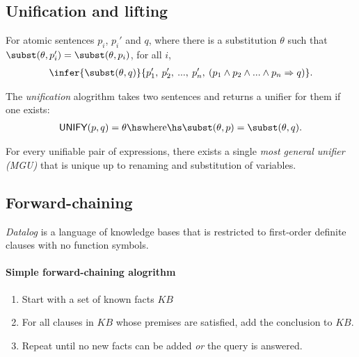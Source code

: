 \documentclass{article}
\begin{document}
\subsection{Unification and lifting}

\begin{theorem}
    For atomic sentences $p_i$, $p_i'$ and $q$, where there is a substitution
    $\theta$ such that $\subst(\theta,p_i')=\subst(\theta,p_i)$, for
    all $i$,
    \begin{align*}
        \infer{\subst(\theta,q)}{p_1',\: p_2',\: ...,\: p_n',\:(p_1\wedge p_2 \wedge ... \wedge p_n\Rightarrow q)}.
    \end{align*}
\end{theorem}

\begin{definition}[R\&N p. 326]
    The \emph{unification} alogrithm takes two sentences and returns a unifier
    for them if one exists:
    \begin{align*}
        \textsf{UNIFY}(p,q)=\theta \hs\text{where}\hs \subst(\theta,p)=\subst(\theta,q).
    \end{align*}
\end{definition}

\begin{theorem}[R\&N p. 327]
    For every unifiable pair of expressions, there exists a single \emph{most general
        unifier (MGU)} that is unique up to renaming and substitution of variables.
\end{theorem}

\subsection{Forward-chaining}

\begin{definition}[R\&N p. 331]
    \emph{Datalog} is a language of knowledge bases that is restricted to first-order
    definite clauses with no function symbols.
\end{definition}

\paragraph{Simple forward-chaining alogrithm}

\begin{enumerate}
    \item Start with a set of known facts $KB$
    \item For all clauses in $KB$ whose premises are satisfied, add the conclusion to $KB$.
    \item Repeat until no new facts can be added \emph{or} the query is answered.
\end{enumerate}
\end{document}
